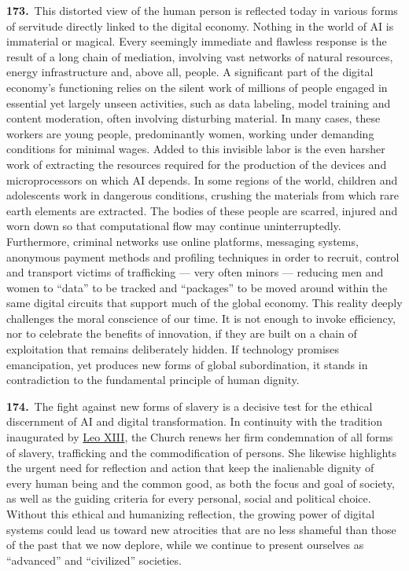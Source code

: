 \documentclass{article}
\begin{document}
\textbf{173.}\ This distorted view of the human person is reflected today in various forms of servitude directly linked to the digital economy. Nothing in the world of AI is immaterial or magical. Every seemingly immediate and flawless response is the result of a long chain of mediation, involving vast networks of natural resources, energy infrastructure and, above all, people. A significant part of the digital economy's functioning relies on the silent work of millions of people engaged in essential yet largely unseen activities, such as data labeling, model training and content moderation, often involving disturbing material. In many cases, these workers are young people, predominantly women, working under demanding conditions for minimal wages. Added to this invisible labor is the even harsher work of extracting the resources required for the production of the devices and microprocessors on which AI depends. In some regions of the world, children and adolescents work in dangerous conditions, crushing the materials from which rare earth elements are extracted. The bodies of these people are scarred, injured and worn down so that computational flow may continue uninterruptedly. Furthermore, criminal networks use online platforms, messaging systems, anonymous payment methods and profiling techniques in order to recruit, control and transport victims of trafficking --- very often minors --- reducing men and women to ``data'' to be tracked and ``packages'' to be moved around within the same digital circuits that support much of the global economy. This reality deeply challenges the moral conscience of our time. It is not enough to invoke efficiency, nor to celebrate the benefits of innovation, if they are built on a chain of exploitation that remains deliberately hidden. If technology promises emancipation, yet produces new forms of global subordination, it stands in contradiction to the fundamental principle of human dignity.

\textbf{174.}\ The fight against new forms of slavery is a decisive test for the ethical discernment of AI and digital transformation. In continuity with the tradition inaugurated by \href{https://www.vatican.va/content/leo-xiii/en.html}{Leo XIII}, the Church renews her firm condemnation of all forms of slavery, trafficking and the commodification of persons. She likewise highlights the urgent need for reflection and action that keep the inalienable dignity of every human being and the common good, as both the focus and goal of society, as well as the guiding criteria for every personal, social and political choice. Without this ethical and humanizing reflection, the growing power of digital systems could lead us toward new atrocities that are no less shameful than those of the past that we now deplore, while we continue to present ourselves as ``advanced'' and ``civilized'' societies.
\end{document}

